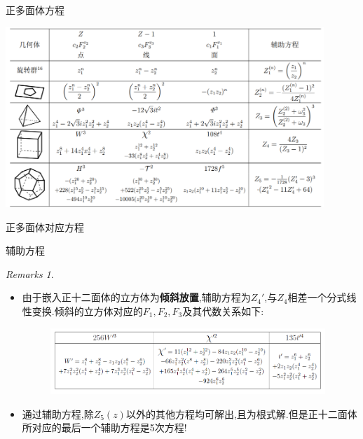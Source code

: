 \documentclass[pdf]{beamer}
\numberwithin{equation}{section}
\theoremstyle{plain}
\theoremstyle{plain}
\theoremstyle{remark}
\newtheorem{remarks}{Remarks}
\begin{document}
\begin{frame}[label=fifth]{正多面体方程}
\begin{table}[ht]
	\centering
	\includegraphics[width=0.9\textwidth]{snip/eqpoly.png}
	\caption{正多面体对应方程}
	\label{tb:equations}
\end{table}
\end{frame}
\begin{frame}{辅助方程}
\begin{remarks}\
	\begin{itemize}
		\item 由于嵌入正十二面体的立方体为\textbf{倾斜放置},辅助方程为$Z_4'$,与$Z_4$相差一个分式线性变换.倾斜的立方体对应的$F_1,F_2,F_3$及其代数关系如下:
		\begin{figure}[ht]
			\centering
			\hspace{-1cm}
			\includegraphics[width=0.98\textwidth]{snip/slantpoly.png}
		\end{figure}
		\item 通过辅助方程,除$Z_5(z)$以外的其他方程均可解出,且为根式解.但是正十二面体所对应的最后一个辅助方程是5次方程!
	\end{itemize}
\end{remarks}
\end{frame}


\end{document}
